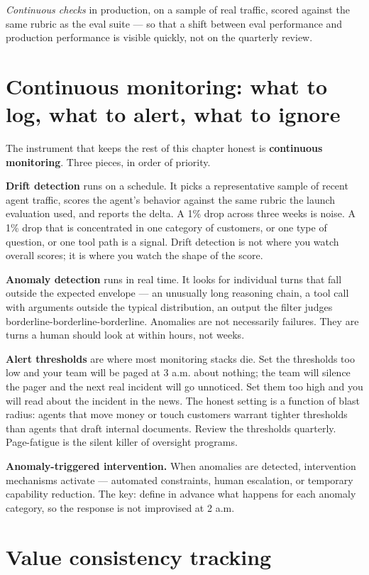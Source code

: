 \textit{Continuous checks} in production, on a sample of real traffic, scored against the same rubric as the eval suite --- so that a shift between eval performance and production performance is visible quickly, not on the quarterly review.

\section{Continuous monitoring: what to log, what to alert, what to ignore}

The instrument that keeps the rest of this chapter honest is \textbf{continuous monitoring}. Three pieces, in order of priority.

\textbf{Drift detection} runs on a schedule. It picks a representative sample of recent agent traffic, scores the agent's behavior against the same rubric the launch evaluation used, and reports the delta. A 1\% drop across three weeks is noise. A 1\% drop that is concentrated in one category of customers, or one type of question, or one tool path is a signal. Drift detection is not where you watch overall scores; it is where you watch the shape of the score.

\textbf{Anomaly detection} runs in real time. It looks for individual turns that fall outside the expected envelope --- an unusually long reasoning chain, a tool call with arguments outside the typical distribution, an output the filter judges borderline-borderline-borderline. Anomalies are not necessarily failures. They are turns a human should look at within hours, not weeks.

\textbf{Alert thresholds} are where most monitoring stacks die. Set the thresholds too low and your team will be paged at 3 a.m. about nothing; the team will silence the pager and the next real incident will go unnoticed. Set them too high and you will read about the incident in the news. The honest setting is a function of blast radius: agents that move money or touch customers warrant tighter thresholds than agents that draft internal documents. Review the thresholds quarterly. Page-fatigue is the silent killer of oversight programs.

\textbf{Anomaly-triggered intervention.} When anomalies are detected, intervention mechanisms activate --- automated constraints, human escalation, or temporary capability reduction. The key: define in advance what happens for each anomaly category, so the response is not improvised at 2 a.m.

\section{Value consistency tracking}

